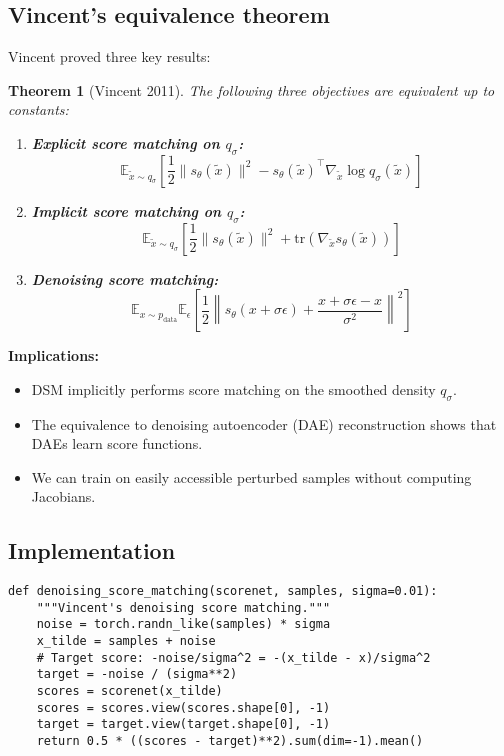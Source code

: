 \documentclass[11pt]{article}
\newtheorem{theorem}{Theorem}[section]
\theoremstyle{definition}
\begin{document}
\subsection{Vincent's equivalence theorem}
Vincent proved three key results:

\begin{theorem}[Vincent 2011]
The following three objectives are equivalent up to constants:
\begin{enumerate}
\item \textbf{Explicit score matching on $q_\sigma$:}
\[
\mathbb{E}_{\tilde{x} \sim q_\sigma}\left[\frac{1}{2}\|s_\theta(\tilde{x})\|^2 - s_\theta(\tilde{x})^\top \nabla_{\tilde{x}} \log q_\sigma(\tilde{x})\right]
\]
\item \textbf{Implicit score matching on $q_\sigma$:}
\[
\mathbb{E}_{\tilde{x} \sim q_\sigma}\left[\frac{1}{2}\|s_\theta(\tilde{x})\|^2 + \text{tr}(\nabla_{\tilde{x}} s_\theta(\tilde{x}))\right]
\]
\item \textbf{Denoising score matching:}
\[
\mathbb{E}_{x\sim p_{\text{data}}}\mathbb{E}_{\epsilon}\left[\frac{1}{2}\left\|s_\theta(x+\sigma\epsilon) + \frac{x+\sigma\epsilon - x}{\sigma^2}\right\|^2\right]
\]
\end{enumerate}
\end{theorem}

\textbf{Implications:}
\begin{itemize}
\item DSM implicitly performs score matching on the smoothed density $q_\sigma$.
\item The equivalence to denoising autoencoder (DAE) reconstruction shows that DAEs learn score functions.
\item We can train on easily accessible perturbed samples without computing Jacobians.
\end{itemize}

\subsection{Implementation}
\begin{lstlisting}[style=py,caption={Denoising score matching loss}]
def denoising_score_matching(scorenet, samples, sigma=0.01):
    """Vincent's denoising score matching."""
    noise = torch.randn_like(samples) * sigma
    x_tilde = samples + noise
    # Target score: -noise/sigma^2 = -(x_tilde - x)/sigma^2
    target = -noise / (sigma**2)
    scores = scorenet(x_tilde)
    scores = scores.view(scores.shape[0], -1)
    target = target.view(target.shape[0], -1)
    return 0.5 * ((scores - target)**2).sum(dim=-1).mean()
\end{lstlisting}
\end{document}
